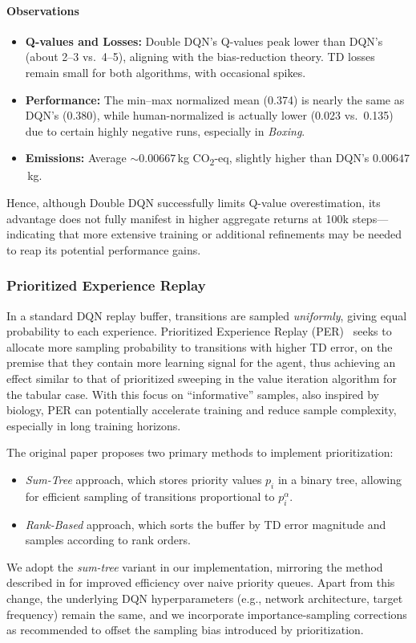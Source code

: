 \paragraph{Observations}
\begin{itemize}
	\item \textbf{Q-values and Losses:} Double DQN’s Q-values peak lower than DQN’s (about 2--3 vs.\ 4--5), aligning with the bias-reduction theory. TD losses remain small for both algorithms, with occasional spikes.
	\item \textbf{Performance:} The min--max normalized mean (0.374) is nearly the same as DQN’s (0.380), while human-normalized is actually lower (0.023 vs.\ 0.135) due to certain highly negative runs, especially in \emph{Boxing}.
	\item \textbf{Emissions:} Average $\sim0.00667$\,kg CO\textsubscript{2}-eq, slightly higher than DQN’s $0.00647$\,kg.
\end{itemize}

Hence, although Double DQN successfully limits Q-value overestimation, its advantage does not 
fully manifest in higher aggregate returns at 100k steps—indicating that more extensive training 
or additional refinements may be needed to reap its potential performance gains.


\subsubsection{Prioritized Experience Replay}
\label{subsubsec:per}
In a standard DQN replay buffer, transitions are sampled \emph{uniformly}, giving equal 
probability to each experience. Prioritized Experience Replay (PER)~\cite{schaul:prioritized} 
seeks to allocate more sampling probability to transitions with higher TD error, 
on the premise that they contain more learning signal for the agent, thus achieving an effect
similar to that of prioritized sweeping in the value iteration algorithm for the tabular case.
With this focus on “informative” samples, also inspired by biology, PER can potentially
accelerate training and reduce sample complexity, especially in long training horizons.

The original paper proposes two primary methods to implement prioritization:
\begin{itemize}
	\item \textit{Sum-Tree} approach, which stores priority values $p_i$ in a binary tree, 
	allowing for efficient sampling of transitions proportional to $p_i^\alpha$.
	\item \textit{Rank-Based} approach, which sorts the buffer by TD error magnitude 
	and samples according to rank orders.
\end{itemize}
We adopt the \emph{sum-tree} variant in our implementation, 
mirroring the method described in \cite{schaul:prioritized} 
for improved efficiency over naive priority queues. 
Apart from this change, the underlying DQN hyperparameters 
(e.g., network architecture, target frequency) remain the same, 
and we incorporate importance-sampling corrections as recommended 
to offset the sampling bias introduced by prioritization.

